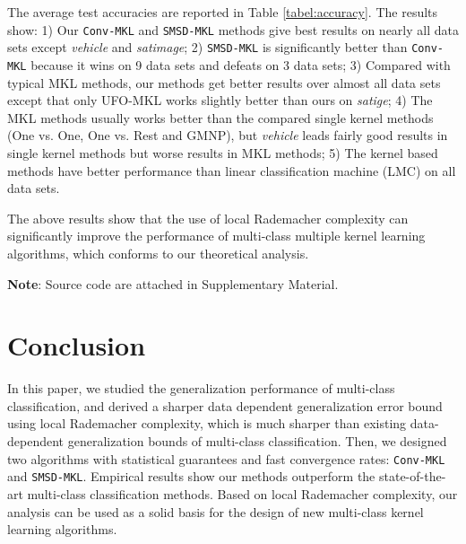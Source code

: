 \documentclass{article}
\begin{document}
The average test accuracies are reported in Table \ref{tabel:accuracy}.
The results show: 1) Our \texttt{Conv-MKL} and \texttt{SMSD-MKL} methods give best results on nearly all data sets
except \textit{vehicle} and \textit{satimage};
2) \texttt{SMSD-MKL} is significantly better than \texttt{Conv-MKL} because it wins on 9 data sets and defeats on 3 data sets;
3) Compared with typical MKL methods,
our methods get better results over almost all data sets except that only UFO-MKL works slightly better than ours on \textit{satige};
4) The MKL methods usually works better than the compared single kernel methods (One vs. One, One vs. Rest and GMNP),
but \textit{vehicle} leads fairly good results in single kernel methods but worse results in MKL methods;
5) The kernel based methods have better performance than linear classification machine (LMC) on all data sets.

The above results show that the use of local Rademacher complexity can significantly improve
the performance of multi-class multiple kernel learning algorithms,
which conforms to our theoretical analysis.

\textbf{Note}: Source code are attached in Supplementary Material.

\section{Conclusion}
In this paper, we studied the generalization performance of multi-class classification,
and derived a sharper data dependent generalization error bound using local Rademacher complexity,
which is much sharper than existing data-dependent generalization bounds of multi-class classification.
Then, we designed two algorithms with statistical guarantees and fast convergence rates:
\texttt{Conv-MKL} and \texttt{SMSD-MKL}.
Empirical results show our methods outperform the state-of-the-art multi-class classification methods.
Based on local Rademacher complexity, our analysis can be used as a solid basis for the
design of new multi-class kernel learning algorithms.




\end{document}

